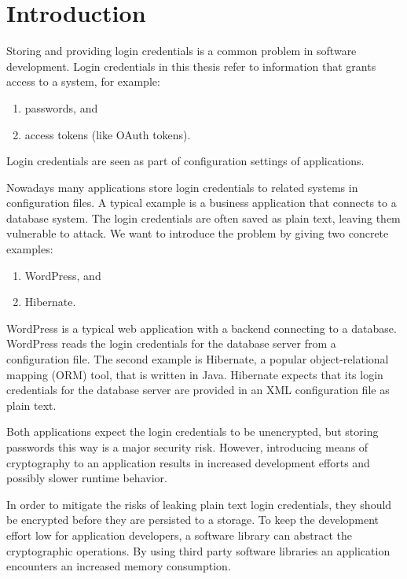 \chapter{Introduction}

Storing and providing login credentials is a common problem in software development.
Login credentials in this thesis refer to information that grants access to a system, for example:

\begin{enumerate}
\item passwords, and
\item access tokens (like OAuth tokens).
\end{enumerate}

Login credentials are seen as part of configuration settings of applications.

Nowadays many applications store login credentials to related systems in configuration files.
A typical example is a business application that connects to a database system.
The login credentials are often saved as plain text, leaving them vulnerable to attack.
We want to introduce the problem by giving two concrete examples:

\begin{enumerate}
\item WordPress, and
\item Hibernate.
\end{enumerate}

WordPress is a typical web application with a backend connecting to a database.
WordPress reads the login credentials for the database server from a configuration file.\cite{wordpress-doc}
The second example is Hibernate, a popular object-relational mapping (ORM) tool, that is written in Java.
Hibernate expects that its login credentials for the database server are provided in an XML configuration file as plain text.\cite{hibernate-doc}

Both applications expect the login credentials to be unencrypted, but storing passwords this way is a major security risk.
However, introducing means of cryptography to an application results in increased development efforts and possibly slower runtime behavior.


In order to mitigate the risks of leaking plain text login credentials, they should be encrypted before they are persisted to a storage.
To keep the development effort low for application developers, a software library can abstract the cryptographic operations.
By using third party software libraries an application encounters an increased memory consumption.

